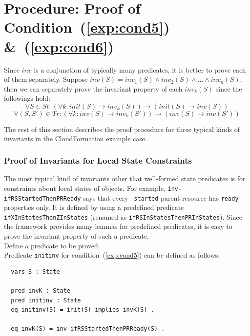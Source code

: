 \documentclass[12pt]{report}
\newcommand{\ra}{\rightarrow}
\begin{document}
\section{Procedure: Proof of Condition~(\ref{exp:cond5}) \&~(\ref{exp:cond6})}
\label{sec:invariant}
Since $inv$ is a conjunction of typically many predicates, it is
better to prove each of them separately. Suppose $inv(S) =
inv_1(S)\land inv_2(S)\land\dots\land inv_n(S)$, then we can
separately prove the invariant property of each $inv_k(S)$ since the
followings hold:
\[\forall S\in St: (\forall k:init(S)\ra inv_k(S))\ra(init(S)\ra inv(S))\]
\[\forall (S,S')\in Tr: (\forall k:inv(S)\ra inv_k(S'))\ra(inv(S)\ra inv(S'))\]

\vspace{0.3cm}
The rest of this section describes the proof procedure for three
typical kinds of invariants in the CloudFormation example case.

\subsubsection*{Proof of Invariants for Local State Constraints}
The most typical kind of invariants other that well-formed state
predicates is for constraints about local states of objects.  For
example, {\tt inv-ifRSStartedThenPRReady} says that every {\tt
  started} parent resource has {\tt ready} properties only.  It is
defined by using a predefined predicate {\tt ifXInStatesThenZInStates}
(renamed as {\tt ifRSInStatesThenPRInStates}). Since the framework
provides many lemmas for predefined predicates, it is easy to
prove the invariant property of such a predicate. \\

 Define a predicate to be proved. \\ Predicate
         {\tt initinv} for condition~(\ref{exp:cond5}) can be defined
         as follows:
\small
\begin{verbatim}
  vars S : State

  pred invK : State
  pred initinv : State
  eq initinv(S) = init(S) implies invK(S) .

  eq invK(S) = inv-ifRSStartedThenPRReady(S) .
\end{verbatim}
\normalsize
\end{document}
